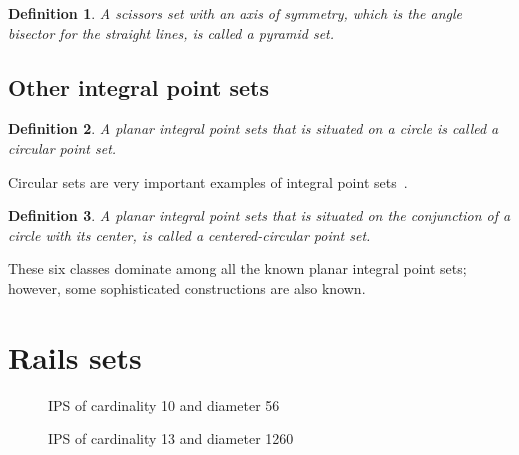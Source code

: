 \documentclass[12pt]{article}
\theoremstyle{theorem}
\theoremstyle{dfn}
\newtheorem{dfn}{Definition}
\theoremstyle{remark}
\begin{document}
\begin{dfn}
	A scissors set with an axis of symmetry,
	which is the angle bisector for the straight lines,
	is called a \textit{pyramid} set.
\end{dfn}



\subsection{Other integral point sets}

\begin{dfn}
	A planar integral point sets that is situated on a circle is called a \textit{circular}
	point set.
\end{dfn}

Circular sets are very important examples
of integral point sets~\cite{harborth1993upper,piepmeyer1996maximum,bat2018number}.


\begin{dfn}
	A planar integral point sets that is situated on the conjunction of a circle with its center,
	is called a \textit{centered-circular} point set.
\end{dfn}

These six classes dominate among all the known planar integral point sets;
however, some sophisticated constructions are also known.


\section{Rails sets}




\begin{figure}[h!]
\parbox{1\linewidth}{\caption{IPS of cardinality 10 and diameter 56}
\label{picture_12.pdf}}
\end{figure}

\begin{figure}[h!]
\parbox{1\linewidth}{\caption{IPS of cardinality 13 and diameter 1260}
\label{picture_1260_R3.pdf}}
\end{figure}
\end{document}
